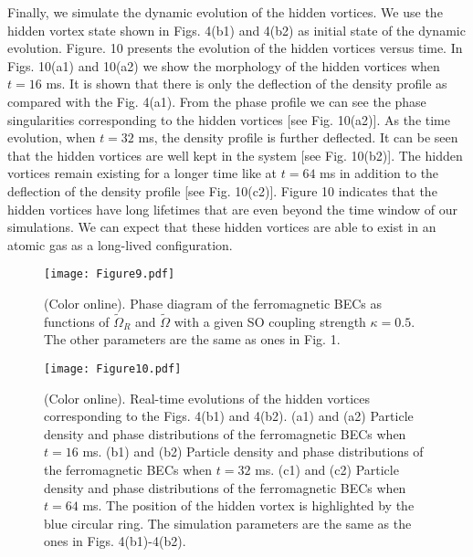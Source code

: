 \documentclass[aps,pra,showpacs,twocolumn,superscriptaddress]{revtex4-1}
\begin{document}
Finally, we simulate the dynamic evolution of the hidden vortices. We use the hidden vortex state shown in Figs. 4(b1) and 4(b2) as initial state of the dynamic evolution. Figure. 10 presents the evolution of the hidden vortices versus time. In Figs. 10(a1) and 10(a2) we show the morphology of the hidden vortices when $t=16$ ms. It is shown that there is only the deflection of the density profile as compared with the Fig. 4(a1). From the phase profile we can see the phase singularities corresponding to the hidden vortices [see Fig. 10(a2)]. As the time evolution, when $t=32$ ms, the density profile is further deflected. It can be seen that the hidden vortices are well kept in the system [see Fig. 10(b2)]. The hidden vortices remain existing for a longer time like at $t=64$ ms in addition to the deflection of the density profile [see Fig. 10(c2)]. Figure 10 indicates that the hidden vortices have long lifetimes that are even beyond the time window of our simulations. We can expect that these hidden vortices are able to exist in an atomic gas as a long-lived configuration.



\begin{figure}
\texttt{[image: Figure9.pdf]}
\caption{(Color online). Phase diagram of the ferromagnetic BECs as functions of $\widetilde{\Omega}_{R}$ and $\tilde{\Omega}$ with a given SO coupling strength $\kappa=0.5$. The other parameters are the same as ones in Fig. 1.} \label{Figure9}
\end{figure}

\begin{figure}
\texttt{[image: Figure10.pdf]}
\caption{(Color online). Real-time evolutions of the hidden vortices corresponding to the Figs. 4(b1) and 4(b2). (a1) and (a2) Particle density and phase distributions of the  ferromagnetic BECs when $t=16$ ms. (b1) and (b2) Particle density and phase distributions of the  ferromagnetic BECs when $t=32$ ms. (c1) and (c2) Particle density and phase distributions of the ferromagnetic BECs when $t=64$ ms. The position of the hidden vortex is highlighted by the blue circular ring. The simulation parameters are the same as the ones in Figs. 4(b1)-4(b2).} \label{Figure10}
\end{figure}
\end{document}
